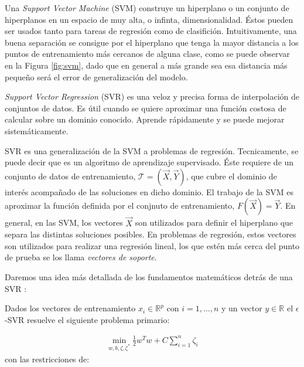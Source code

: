   \par Una \textit{Support Vector Machine} (SVM) \cite{first_svm} construye un
    hiperplano o un conjunto de hiperplanos en un espacio
    de muy alta, o infinta, dimensionalidad. Éstos pueden ser usados tanto para
    tareas de regresión como de clasifición. Intuitivamente, una buena separación
    se consigue por el hiperplano que tenga la mayor distancia a los puntos de
    entrenamiento más cercanos de alguna clase, como se puede observar en la
    Figura \ref{fig:svm}, dado que en general
    a más grande sea esa distancia más pequeño será el error de generalización del
    modelo.

  \par \textit{Support Vector Regression} (SVR)\cite{support_vector_regression, review_svr}
    es una veloz y precisa forma de interpolación de conjuntos de datos.
    Es útil cuando se quiere aproximar una función costosa de calcular sobre un
    dominio conocido. Aprende rápidamente y se puede mejorar sistemáticamente.

  \par SVR es una generalización de la SVM a problemas de regresión. Tecnicamente,
    se puede decir que es un algoritmo de aprendizaje supervisado. Éste
    requiere de un conjunto de datos de entrenamiento,
    $\mathcal{T} = (\vec{X}, \vec{Y})$, que cubre el dominio de interés acompañado
    de las soluciones en dicho dominio. El trabajo de la SVM es aproximar la función
    definida por el conjnuto de entrenamiento, $F(\vec{X}) = \vec{Y}$. En general,
    en las SVM, los vectores $\vec{X}$ son utilizados para definir el hiperplano que
    separa las distintas soluciones posibles. En problemas de regresión, estos
    vectores son utilizados para realizar una regresión lineal, los que estén
    más cerca del punto de prueba se los llama \textit{vectores de soporte}.

    Daremos una idea más detallada de los fundamentos matemáticos detrás de una
    SVR \cite{svr_tutorial}:

    Dados los vectores de entrenamiento $x_{i} \in \mathbb{R}^{p}$ con $i = 1, \dots ,n$
    y un vector $y \in \mathbb{R}$ el $\epsilon$-SVR resuelve el siguiente problema
    primario:

    \begin{align}
      \min\limits_{w, b, \zeta, \zeta^{*}} \frac{1}{2} w^{T} w + C \sum_{i = 1}^{n} \zeta_{i}
    \end{align}
    con las restricciones de:


